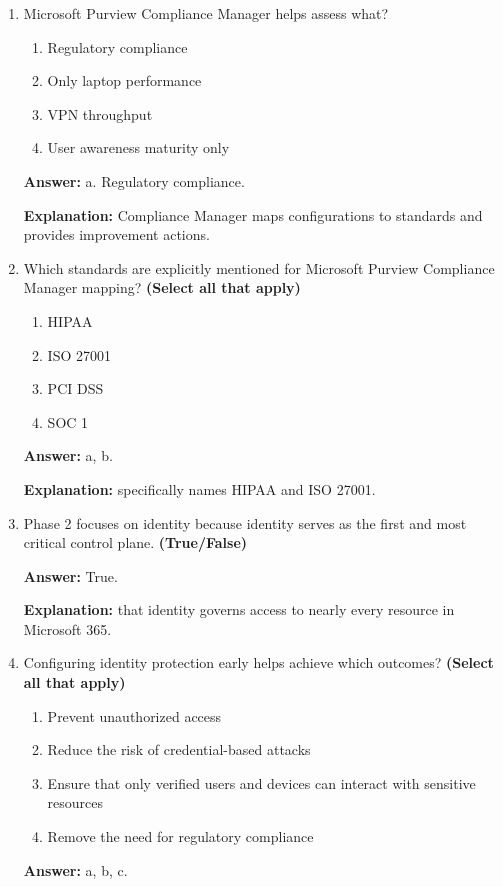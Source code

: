 \documentclass[10pt]{article}
\begin{document}
\begin{enumerate}[leftmargin=*]
\textbf{Explanation:} These are the specific recommendations listed in the documentation.

\item Microsoft Purview Compliance Manager helps assess what?
\begin{enumerate}[label=\alph*., leftmargin=1.5em]
\item Regulatory compliance
\item Only laptop performance
\item VPN throughput
\item User awareness maturity only
\end{enumerate}
\textbf{Answer:} a. Regulatory compliance.

\textbf{Explanation:} Compliance Manager maps configurations to standards and provides improvement actions.

\item Which standards are explicitly mentioned for Microsoft Purview Compliance Manager mapping? \textbf{(Select all that apply)}
\begin{enumerate}[label=\alph*., leftmargin=1.5em]
\item HIPAA
\item ISO 27001
\item PCI DSS
\item SOC 1
\end{enumerate}
\textbf{Answer:} a, b.

\textbf{Explanation:} specifically names HIPAA and ISO 27001.

\item Phase 2 focuses on identity because identity serves as the first and most critical control plane. \textbf{(True/False)}

\textbf{Answer:} True.

\textbf{Explanation:} that identity governs access to nearly every resource in Microsoft 365.

\item Configuring identity protection early helps achieve which outcomes? \textbf{(Select all that apply)}
\begin{enumerate}[label=\alph*., leftmargin=1.5em]
\item Prevent unauthorized access
\item Reduce the risk of credential-based attacks
\item Ensure that only verified users and devices can interact with sensitive resources
\item Remove the need for regulatory compliance
\end{enumerate}
\textbf{Answer:} a, b, c.


\end{enumerate}
\end{document}
